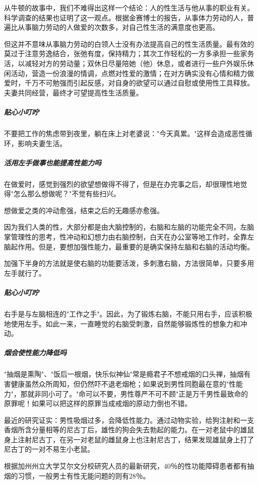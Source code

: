 从牛顿的故事中，我们不难得出这样一个结论：人的性生活与他从事的职业有关。科学调查的结果也证明了这一观点。根据金赛博士的报告，从事体力劳动的人，普遍比从事脑力劳动的人做爱的次数多，对自己性生活的满意度也更高。

但这并不意味从事脑力劳动的白领人士没有办法提高自己的性生活质量。最有效的莫过于注意劳逸结合，张弛有度，保持精力；其次工作轻松的一方多承担一些家务活，以减轻对方的劳动量；双休日尽量陪她（他）休息，或者进行一些户外娱乐休闲活动，营造一份浪漫的情调，点燃对性爱的激情；在对方确实没有心情和精力做爱时，千万不可勉强而引起反感，对自身的欲望可以通过自慰或使用性工具释放。夫妻共同经营，最终才可望提高性生活质量。

\subparagraph{贴心小叮咛}

不要把工作的焦虑带到夜里，躺在床上对老婆说："今天真累。"这样会造成恶性循环，影响夫妻生活。

\subparagraph{活用左手做事也能提高性能力吗}

在做爱时，感觉到强烈的欲望想做得不得了，但是在办完事之后，却很理性地觉得"怎么那么想做呢？"不觉有些扫兴。

想做爱之类的冲动愈强，结束之后的无趣感亦愈强。

因为我们人类的性，大部分都是由大脑控制的，右脑和左脑的功能完全不同，左脑掌管理性的思考，性冲动和幻想力由右脑控制，白天在办公室等地工作时，全靠左脑起作用。但是，要想加强性能力，最重要的是确实保持左脑和右脑的活动均衡。

加强下半身的方法就是使右脑的功能要活泼，多刺激右脑，方法很简单，只要多用左手就行了。

\subparagraph{贴心小叮咛}

右手是与左脑相连的"工作之手"。因此，为了锻炼右脑，不能只用右手，应该积极地使用左手。如此一来，一直睡觉的右脑受刺激，自然能够锻炼性的想象力和冲动。

\subparagraph{烟会使性能力降低吗}

"抽烟是熏陶"、"饭后一根烟，快乐似神仙"常是瘾君子不想戒烟的口头禅，抽烟有害健康虽然众所周知，但仍然吓不退老烟枪；如果说到男性同胞最在意的"性能力"，那就非同小可了。"命可以不要，男性尊严不可不顾"正是万千男性最致命的原罪呢！如果可以把这样的原罪当成戒烟的原动力倒也不错。

最近的研究证实：男性吸烟过多，会降低性能力。通过动物实验，给狗注射和一支香烟所含分量相等的尼古丁后，雄性的狗会失去勃起的能力。在一对老鼠中的雄鼠身上注射尼古丁，在另一对老鼠的雌鼠身上也注射尼古丁，结果发现雄鼠身上打了尼古丁的一对不易生小老鼠。

根据加州州立大学艾尔文分校研究人员的最新研究，40％的性功能障碍患者都有抽烟的习惯，一般男士有性无能问题的则有28％。

